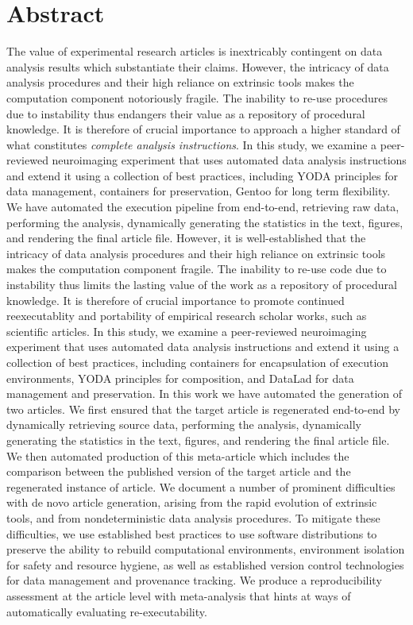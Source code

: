 \section{Abstract}

The value of experimental research articles is inextricably contingent on data analysis results which substantiate their claims.
However, the intricacy of data analysis procedures and their high reliance on extrinsic tools makes the computation component notoriously fragile.
The inability to re-use procedures due to instability thus endangers their value as a repository of procedural knowledge.
It is therefore of crucial importance to approach a higher standard of what constitutes \textit{complete analysis instructions}.
In this study, we examine a peer-reviewed neuroimaging experiment that uses automated data analysis instructions and extend it using a collection of best practices, including YODA principles for data management, containers for preservation, Gentoo for long term flexibility.
We have automated the execution pipeline from end-to-end, retrieving raw data, performing the analysis, dynamically generating the statistics in the text, figures, and rendering the final article file.
However, it is well-established that the intricacy of data analysis procedures and their high reliance on extrinsic tools makes the computation component fragile.
The inability to re-use code due to instability thus limits the lasting value of the work as a repository of procedural knowledge.
It is therefore of crucial importance to promote continued reexecutablity and portability of empirical research scholar works, such as scientific articles.
In this study, we examine a peer-reviewed neuroimaging experiment that uses automated data analysis instructions and extend it using a collection of best practices, including containers for encapsulation of execution environments, YODA principles for composition, and DataLad for data management and preservation.
In this work we have automated the generation of two articles.
We first ensured that the target article is regenerated end-to-end by dynamically retrieving source data, performing the analysis, dynamically generating the statistics in the text, figures, and rendering the final article file.
We then automated production of this meta-article which includes the comparison between the published version of the target article and the regenerated instance of article.
We document a number of prominent difficulties with de novo article generation, arising from the rapid evolution of extrinsic tools, and from nondeterministic data analysis procedures.
To mitigate these difficulties, we use established best practices to use software distributions to preserve the ability to rebuild computational environments, environment isolation for safety and resource hygiene, as well as established version control technologies for data management and provenance tracking.
We produce a reproducibility assessment at the article level with meta-analysis that hints at ways of automatically evaluating re-executability.

